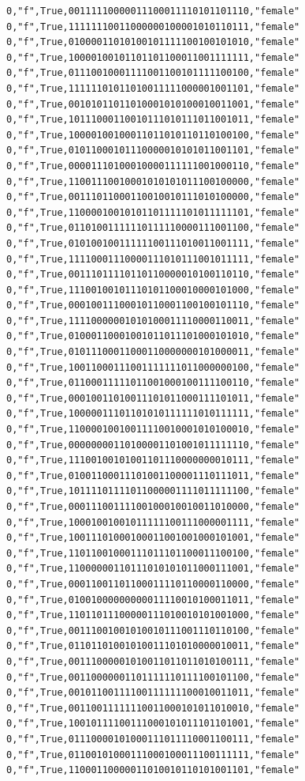 \documentclass[authoryearcitations]{UoYCSproject}
\begin{document}
\begin{framed}
\begin{verbatim}
0,"f",True,00111110000011100011110101101110,"female"
0,"f",True,11111110011000000100001010110111,"female"
0,"f",True,01000011010100101111100100101010,"female"
0,"f",True,10000100101101101100011001111111,"female"
0,"f",True,01110010001111001100101111100100,"female"
0,"f",True,11111101011010011111000001001101,"female"
0,"f",True,00101011011010001010100010011001,"female"
0,"f",True,10111000110010111010111011001011,"female"
0,"f",True,10000100100011011010110110100100,"female"
0,"f",True,01011000101110000010101011001101,"female"
0,"f",True,00001110100010000111111001000110,"female"
0,"f",True,11001110010001010101011100100000,"female"
0,"f",True,00111011000110010010111010100000,"female"
0,"f",True,11000010010101101111101011111101,"female"
0,"f",True,01101001111110111110000111001100,"female"
0,"f",True,01010010011111100111010011001111,"female"
0,"f",True,11110001110000111010111001011111,"female"
0,"f",True,00111011110110110000010100110110,"female"
0,"f",True,11100100101110101100010000101000,"female"
0,"f",True,00010011100010110001100100101110,"female"
0,"f",True,11110000001010100011110000110011,"female"
0,"f",True,01000110001001011011101000101010,"female"
0,"f",True,01011100011000110000000101000011,"female"
0,"f",True,10011000111001111111011000000100,"female"
0,"f",True,01100011111011001000100111100110,"female"
0,"f",True,00010011010011101011000111101011,"female"
0,"f",True,10000011101101010111111010111111,"female"
0,"f",True,11000010010011110010001010100010,"female"
0,"f",True,00000000110100001101001011111110,"female"
0,"f",True,11100100101001101110000000010111,"female"
0,"f",True,01001100011101001100001110111011,"female"
0,"f",True,10111101111011000001111011111100,"female"
0,"f",True,00011100111100100010010011010000,"female"
0,"f",True,10001001001011111100111000001111,"female"
0,"f",True,10011101000100011001001000101001,"female"
0,"f",True,11011001000111011101100011100100,"female"
0,"f",True,11000000110111010101011000111001,"female"
0,"f",True,00011001101100011110110000110000,"female"
0,"f",True,01001000000000011110010100011011,"female"
0,"f",True,11011011100000111010010101001000,"female"
0,"f",True,00111001001010010111001110110100,"female"
0,"f",True,01101101001010011101010000010011,"female"
0,"f",True,00111000001010011011011010100111,"female"
0,"f",True,00110000001101111110111100101100,"female"
0,"f",True,00101100111100111111100010011011,"female"
0,"f",True,00110011111110011000101011010010,"female"
0,"f",True,10010111100111000101011101101001,"female"
0,"f",True,01110000101000111011110001100111,"female"
0,"f",True,01100101000111000100011100111111,"female"
0,"f",True,11000110000011010010110101001101,"female"

\end{verbatim}
\end{framed}
\end{document}
